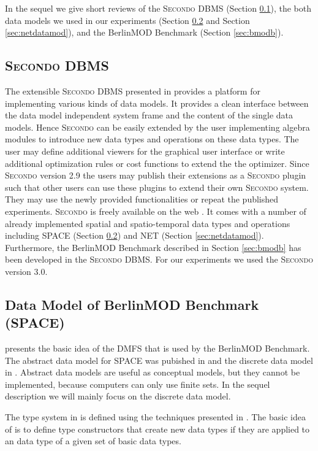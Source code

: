 \documentclass[a4paper]{article}
\newcommand{\secondo}{\textsc{Secondo}}
\newcommand{\bmodb} {BerlinMOD Benchmark}
\begin{document}
In the sequel we give short reviews of the \secondo{} DBMS
(Section \ref{sec:secondo}), the both data models we used in our experiments
(Section \ref{sec:bmodbdatamod} and Section \ref{sec:netdatamod}), and the \bmodb{}
(Section \ref{sec:bmodb}).
\subsection{\secondo{} DBMS}
\label{sec:secondo}
The extensible \secondo{} DBMS presented in
\cite{SecondoEnvironmentDieker,SecondoPlatformPrototypingGueting} provides a
platform for implementing various kinds of data models. It provides a clean
interface between the data model independent system frame and the content of the
single data models. Hence \secondo{} can be easily extended by the user
implementing algebra modules to introduce new data types and operations on
these data types. The user may define additional viewers for the graphical user
interface or write additional optimization rules or cost functions to extend the
the optimizer. Since \secondo{} version 2.9 the users may publish their extensions
as a \secondo{} plugin such that other users can use these plugins to extend
their own
\secondo{} system. They may use the newly provided functionalities or repeat the
published experiments. \secondo{} is freely available on the web \cite{secondoweb}.
It comes with a number of already implemented spatial and spatio-temporal data types
and operations including SPACE (Section \ref{sec:bmodbdatamod}) and NET
(Section \ref{sec:netdatamod}). Furthermore, the \bmodb{}
described in Section \ref{sec:bmodb} has been developed in the \secondo{} DBMS.
For our experiments we used the \secondo{} version 3.0.
\subsection{Data Model of \bmodb{} (SPACE)}
\label{sec:bmodbdatamod}
\cite{STDTModelingQueryingMOinDErwig} presents the basic idea of the DMFS that
is used by the \bmodb{}. The abstract data model for SPACE was pubished in
\cite{RepresentingMovingObjectsGueting} and the discrete data model in
\cite{DataModelDataStructureGueting}. Abstract data models are useful as conceptual
models, but they cannot be implemented, because computers can only use finite sets.
In the sequel description we will mainly focus on the discrete data model.

The type system in \cite{RepresentingMovingObjectsGueting} is defined using the
techniques presented in \cite{SecondOrderSignatureGueting}. The basic idea of
\cite{RepresentingMovingObjectsGueting} is to define type constructors
that create new data types if they are applied to an data type of a given set of
basic data types.
\end{document}
